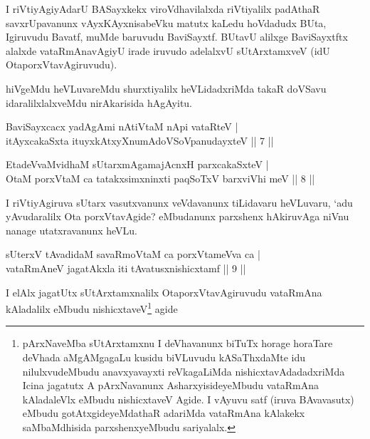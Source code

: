 \begin{artha}
I riVtiyAgiyAdarU BASayxkekx viroVdhavilalxda riVtiyalilx padAthaR savxrUpavanunx vAyxKAyxnisabeVku matutx kaLedu hoVdadudx BUta, Igiruvudu Bavatf, muMde baruvudu BaviSayxtf. BUtavU alilxge BaviSayxtftx alalxde vataRmAnavAgiyU irade iruvudo adelalxvU sUtArxtamxveV (idU OtaporxVtavAgiruvudu).

hiVgeMdu heVLuvareMdu shurxtiyalilx heVLidadxriMda takaR doVSavu idaralilxlalxveMdu nirAkarisida hAgAyitu.
\end{artha}%

\begin{shl}
BaviSayxcacx yadAgAmi nAtiVtaM nApi vataRteV |\\
itAyxcakaSxta ituyxkAtxyX\s numAdoVSoV\s panudayxteV \hfill || 7 ||
\end{shl}

\begin{shl}
EtadeVvaMvidhaM sUtarxmAgamajAcnxH parxcakaSxteV |\\
OtaM porxVtaM ca tatakxsimxninxti paqSoTxV barxviVhi meV \hfill || 8 ||
\end{shl}

\begin{artha}
I riVtiyAgiruva sUtarx vasutxvanunx veVdavanunx tiLidavaru heVLuvaru, `adu yAvudaralilx Ota porxVtavAgide? eMbudanunx parxshenx hAkiruvAga niVnu nanage utatxravanunx heVLu.
\end{artha}


\begin{shl}
sUterxV tAvadidaM savaRmoVtaM ca porxVtameVva ca |\\
vataRmAneV jagatAkxla iti tAvatusxnishicxtamf \hfill || 9 ||
\end{shl}

\begin{artha}
I elAlx jagatUtx sUtArxtamxnalilx OtaporxVtavAgiruvudu vataRmAna kAladalilx eMbudu nishicxtaveV\footnote{pArxNaveMba sUtArxtamxnu I deVhavanunx biTuTx horage horaTare deVhada aMgAMgagaLu kusidu biVLuvudu kASaThxdaMte idu nilulxvudeMbudu anavxyavayxti reVkagaLiMda nishicxtavAdadadxriMda Icina jagatutx A pArxNavanunx AsharxyisideyeMbudu vataRmAna kAladaleVlx eMbudu nishicxtaveV Agide. I vAyuvu satf (iruva BAvavasutx) eMbudu gotAtxgideyeMdathaR adariMda vataRmAna kAlakekx saMbaMdhisida parxshenxyeMbudu sariyalalx.} agide
\end{artha}

